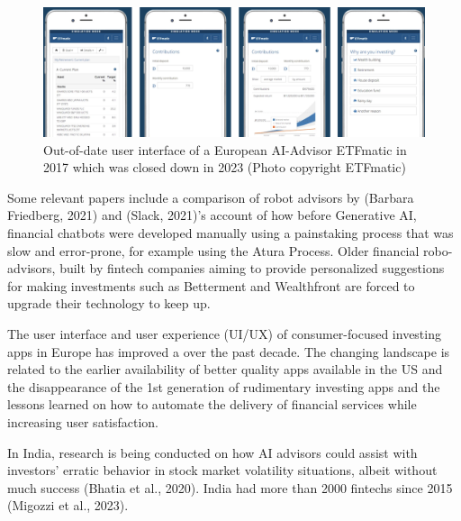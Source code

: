 \documentclass[
  letterpaper,
  DIV=11,
  numbers=noendperiod]{scrartcl}
\begin{document}
\begin{figure}[H]

{\centering \includegraphics[width=1\linewidth,height=\textheight,keepaspectratio]{./images/ai/etfmatic.png}

}

\caption{Out-of-date user interface of a European AI-Advisor ETFmatic in
2017 which was closed down in 2023 (Photo copyright ETFmatic)}

\end{figure}%

Some relevant papers include a comparison of robot advisors by (Barbara
Friedberg, 2021) and (Slack, 2021)'s account of how before Generative
AI, financial chatbots were developed manually using a painstaking
process that was slow and error-prone, for example using the Atura
Process. Older financial robo-advisors, built by fintech companies
aiming to provide personalized suggestions for making investments such
as Betterment and Wealthfront are forced to upgrade their technology to
keep up.

The user interface and user experience (UI/UX) of consumer-focused
investing apps in Europe has improved a over the past decade. The
changing landscape is related to the earlier availability of better
quality apps available in the US and the disappearance of the 1st
generation of rudimentary investing apps and the lessons learned on how
to automate the delivery of financial services while increasing user
satisfaction.

In India, research is being conducted on how AI advisors could assist
with investors' erratic behavior in stock market volatility situations,
albeit without much success (Bhatia et al., 2020). India had more than
2000 fintechs since 2015 (Migozzi et al., 2023).
\end{document}
